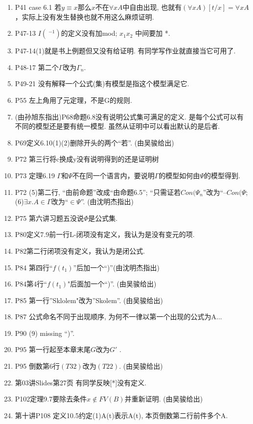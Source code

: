 \documentclass{article}
\begin{document}
\begin{enumerate}
\item P41 case 6.1 若$y\equiv x$那么$x$不在$\forall xA$中自由出现, 也就有$(\forall xA)[t/x] = \forall xA$，实际上没有发生替换也就不用这么麻烦证明. 
\item P47-13 $I(~^{-1})$的定义没有加mod; $x_1x_2$ 中间要加 *. 
\item P47-14(1)就是书上例题但又没有给证明. 有同学写作业就直接当它可用了. 
\item P48-17 第二个$\Gamma$改为$\Gamma_n$. 
\item P49-21 没有解释一个公式(集)有模型是指这个模型满足它. 
\item P55 左上角用了元定理，不是G的规则. 
\item (由孙旭东指出)P68命题6.8没有说明公式集可满足的定义. 是每个公式可以有不同的模型还是要有统一模型. 虽然从证明中可以看出默认的是后者. 
\item P69定义6.10(1)(2)删除开头的两个``若''. (由吴骏给出)
\item P72 第三行将c换成y没有说明得到的还是证明树
\item P73 定理6.19 $\Gamma$和$\Psi$不在同一个语言内，要说明$\Gamma$的模型如何由$\Psi$的模型得到. 
\item P72 (5)第二行, ``由前命题''改成``由命题6.5''; ``只需证若$Con(\Psi_n$''改为``--$Con(\Psi$; (6)$\exists x.A \in \Gamma$改为``$\in \Psi$''. (由沈明杰指出)
\item P75 第六讲习题五没说$\Phi$是公式集. 
\item P80定义7.9前一行L-闭项没有定义，我认为是没有变元的项. 
\item P82第二行闭项没有定义，我认为是闭公式. 
\item P84 第四行``$f(t_1)$''后加一个``)''(由沈明杰指出)
\item P84第4行``$f(t_1)$"后面加一个``)''. (由吴骏给出)
\item P85 第一行''Sklolem"改为''Skolem''. (由吴骏给出)
\item P87 公式命名不同于出现顺序, 为何不一律以第一个出现的公式为A...
\item P90 (9) missing ``)''. 
\item P95 第一行起至本章末尾$G$改为$G'$ . 
\item P95 倒数第6行$(T32)$改为$(T22)$. (由吴骏给出)
\item 第03讲Slides第27页 有同学反映[*]没有定义. 
\item P102定理9.7要除去条件$x\notin FV(B)$并重新证明. (由吴骏给出)
\item 第十讲P108 定义10.5约定(1)A(t)表示A(t), 本页倒数第二行前件多个A. 

\end{enumerate}
\end{document}
